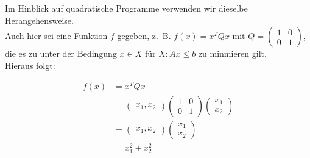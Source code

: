 Im Hinblick auf quadratische Programme verwenden wir dieselbe Herangehensweise. \\
Auch hier sei eine Funktion $f$ gegeben, z.~B. $f(x) = x^{T}Qx$ mit $Q = \begin{pmatrix}1 & 0 \\ 0 & 1 \end{pmatrix}$, die es zu unter der Bedingung $x \in X$ für $X: Ax \le b$ zu minmieren gilt.\\
Hieraus folgt:

\begin{align*}
f(x) &= x^{T}Qx \\
&= \begin{pmatrix}x_{1}, x_{2}\end{pmatrix} \begin{pmatrix}1 & 0 \\ 0 & 1\end{pmatrix} \begin{pmatrix}x_{1} \\ x_{2}\end{pmatrix} \\
&= \begin{pmatrix}x_{1}, x_{2}\end{pmatrix} \begin{pmatrix}x_{1} \\ x_{2}\end{pmatrix} \\
&= x_{1}^{2} + x_{2}^{2}
\end{align*}